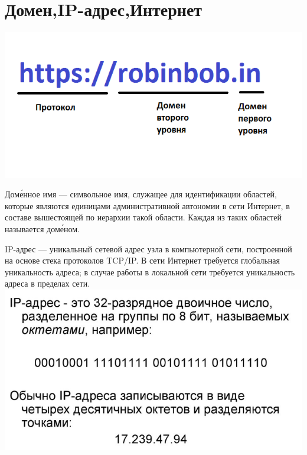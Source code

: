 \documentclass[a4paper,14pt]{extarticle}
\begin{document}
\newpage
\section{Домен,IP-адрес,Интернет}




\includegraphics[width=1\linewidth]{domen.png}

Доме́нное имя — символьное имя, служащее для идентификации областей, которые являются единицами административной автономии в сети Интернет, в составе вышестоящей по иерархии такой области. Каждая из таких областей называется доме́ном.
\label{fig:mpr}
\newpage




\centering
IP-адрес — уникальный сетевой адрес узла в компьютерной сети, построенной на основе стека протоколов TCP/IP. В сети Интернет требуется глобальная уникальность адреса; в случае работы в локальной сети требуется уникальность адреса в пределах сети.
\includegraphics[width=1\linewidth]{ip.png}
\label{fig:mpr}
\newpage
\end{document}
